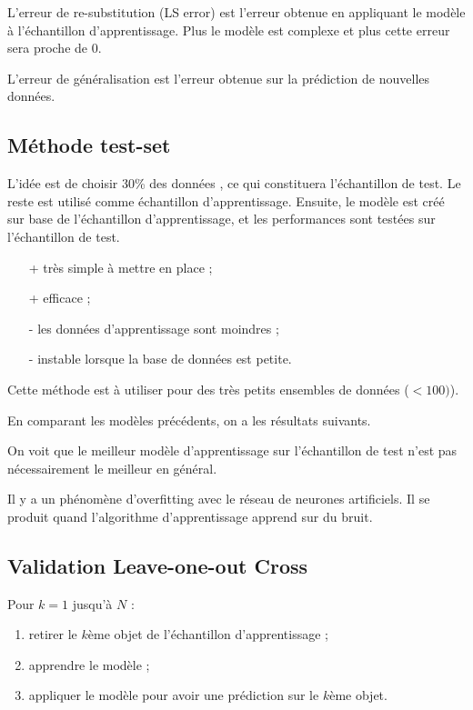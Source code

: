 L'erreur de re-substitution (LS error) est l'erreur obtenue en appliquant le modèle à l'échantillon d'apprentissage. Plus le modèle est complexe et plus cette erreur sera proche de 0.

L'erreur de généralisation est l'erreur obtenue sur la prédiction de nouvelles données.

\subsection{Méthode test-set}

L'idée est de choisir 30\% des données , ce qui constituera l'échantillon de test. Le reste est utilisé comme échantillon d'apprentissage. Ensuite, le modèle est créé sur base de l'échantillon d'apprentissage, et les performances sont testées sur l'échantillon de test.

\begin{itemize}
	\item[+] très simple à mettre en place ;
	\item[+] efficace ;
	\item[-] les données d'apprentissage sont moindres ;
	\item[-] instable lorsque la base de données est petite.
\end{itemize}

Cette méthode est à utiliser pour des très petits ensembles de données ($< 100)$).

En comparant les modèles précédents, on a les résultats suivants.


On voit que le meilleur modèle d'apprentissage sur l'échantillon de test n'est pas nécessairement le meilleur en général.

Il y a un phénomène d'overfitting avec le réseau de neurones artificiels. Il se produit quand l'algorithme d'apprentissage apprend sur du bruit.

\subsection{Validation Leave-one-out Cross}

Pour $k = 1$ jusqu'à $N$ :

\begin{enumerate}
	\item retirer le $k$ème objet de l'échantillon d'apprentissage ;
	\item apprendre le modèle ;
	\item appliquer le modèle pour avoir une prédiction sur le $k$ème objet.
\end{enumerate}

